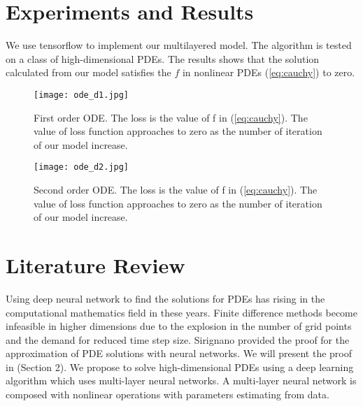 \documentclass{article}
\begin{document}
\section{Experiments and Results}

We use tensorflow to implement our multilayered model. The algorithm is tested on a class of high-dimensional PDEs. The results shows that the solution calculated from our model satisfies the $f$ in nonlinear PDEs (\ref{eq:cauchy}) to zero.

\begin{figure}
	\texttt{[image: ode\_d1.jpg]}
	\caption{First order ODE. The loss is the value of f in (\ref{eq:cauchy}). The value of loss function approaches to zero as the number of iteration of our model increase.}
	\label{fig:ode_d1}
\end{figure}

\begin{figure}
	\texttt{[image: ode\_d2.jpg]}
	\caption{Second order ODE. The loss is the value of f in (\ref{eq:cauchy}). The value of loss function approaches to zero as the number of iteration of our model increase.}
	\label{fig:ode_d2}
\end{figure}


\section{Literature Review}

Using deep neural network to find the solutions for PDEs has rising in the computational mathematics field in these years.  Finite difference methods become infeasible in higher dimensions due to the explosion in the number of grid points and the demand for reduced time step size. Sirignano \cite{sirignano} provided the proof for the approximation of PDE solutions with neural networks. We will present the proof in (Section 2). We propose to solve high-dimensional PDEs using a deep learning algorithm which uses multi-layer neural networks. A multi-layer neural network is composed with nonlinear operations with parameters estimating from data.




\end{document}

